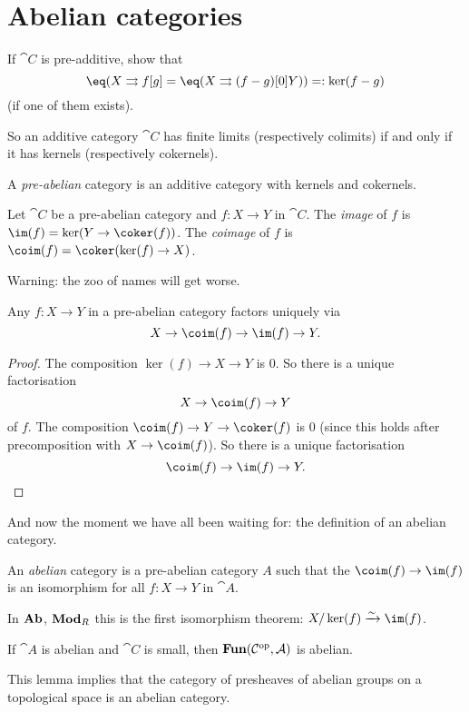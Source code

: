 \documentclass[../main.tex]{subfiles}
\begin{document}
\section{Abelian categories}
\begin{exc}
	If $\cat C$ is pre-additive, show that \[
    	\eq(X \rightrightarrows{f}[g] = \eq(X \rightrightarrows{(f-g)}[0] Y)) =: \ker(f-g)
    \] (if one of them exists).
\end{exc}
So an additive category $\cat C$ has finite limits (respectively colimits) if and only if it has kernels (respectively cokernels).
\begin{defn}
	A \emph{pre-abelian} category is an additive category with kernels and cokernels.
\end{defn}
\begin{defn}
	Let $\cat C$ be a pre-abelian category and $f: X \to Y$ in $\cat C$. The \emph{image} of $f$ is $\im(f) = \ker(Y \to \coker(f))$. The \emph{coimage} of $f$ is $\coim(f) = \coker(\ker(f) \to X)$.
\end{defn}
Warning: the zoo of names will get worse.
\begin{lem}
	Any $f: X \to Y$ in a pre-abelian category factors uniquely via \[
    	X \to \coim(f) \to \im(f) \to Y.
    \]
\end{lem}
\begin{proof}
	The composition $\ker(f) \to X \to Y$ is $0$. So there is a unique factorisation \[
    	X \to \coim(f) \to Y
    \] of $f$. The composition $\coim(f) \to Y \to \coker(f)$ is $0$ (since this holds after precomposition with $X \to \coim(f)$). So there is a unique factorisation \[
    	\coim(f) \to \im(f) \to Y.
    \]
\end{proof}
And now the moment we have all been waiting for: the definition of an abelian category.

\begin{defn}
	An \emph{abelian} category is a pre-abelian category $A$ such that the $\coim(f) \to \im(f)$ is an isomorphism for all $f: X \to Y$ in $\cat A$.
\end{defn}
\begin{exmp}
	In $\mathbf{Ab}$, $\catModule_R$ this is the first isomorphism theorem: $X/\ker(f) \xrightarrow{\sim} \im(f)$.
\end{exmp}
\begin{lem}
	If $\cat A$ is abelian and $\cat C$ is small, then $\operatorname{\mathbf{Fun}}(\mathcal{C}^{\mathrm{op}}, \mathcal{A})$ is abelian.
\end{lem}
This lemma implies that the category of presheaves of abelian groups on a topological space is an abelian category.
\end{document}
